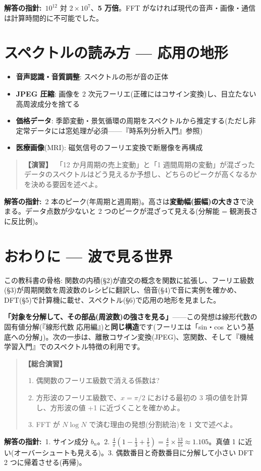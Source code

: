 \documentclass{article}
\begin{document}
\textbf{解答の指針:}\ \(10^{12}\) 対 \(2 \times 10^7\)、\textbf{5 万倍}。FFT がなければ現代の音声・画像・通信は計算時間的に不可能でした。

\section{スペクトルの読み方 — 応用の地形}

\begin{itemize}
\item \textbf{音声認識・音質調整}: スペクトルの形が音の正体
\item \textbf{JPEG 圧縮}: 画像を 2 次元フーリエ(正確にはコサイン変換)し、目立たない高周波成分を捨てる
\item \textbf{価格データ}: 季節変動・景気循環の周期をスペクトルから推定する(ただし非定常データには窓処理が必須——『時系列分析入門』参照)
\item \textbf{医療画像}(MRI): 磁気信号のフーリエ変換で断層像を再構成
\end{itemize}

\begin{quote}
\textbf{【演習】}\ 「12 か月周期の売上変動」と「1 週間周期の変動」が混ざったデータのスペクトルはどう見えるか予想し、どちらのピークが高くなるかを決める要因を述べよ。
\end{quote}

\textbf{解答の指針:}\ 2 本のピーク(年周期と週周期)。高さは\textbf{変動幅(振幅)の大きさ}で決まる。データ点数が少ないと 2 つのピークが混ざって見える(分解能 = 観測長さに反比例)。

\section{おわりに — 波で見る世界}

この教科書の骨格: 関数の内積(§2)が直交の概念を関数に拡張し、フーリエ級数(§3)が周期関数を周波数のレシピに翻訳し、倍音(§4)で音に実例を確かめ、DFT(§5)で計算機に載せ、スペクトル(§6)で応用の地形を見ました。

\textbf{「対象を分解して、その部品(周波数)の強さを見る」}——この発想は線形代数の固有値分解(『線形代数 応用編』)と\textbf{同じ構造}です(フーリエは「sin・cos という基底への分解」)。次の一歩は、離散コサイン変換(JPEG)、窓関数、そして『機械学習入門』でのスペクトル特徴の利用です。

\begin{quote}
\textbf{【総合演習】}
\begin{enumerate}
\item 偶関数のフーリエ級数で消える係数は?
\item 方形波のフーリエ級数で、\(x = \pi/2\) における最初の 3 項の値を計算し、方形波の値 +1 に近づくことを確かめよ。
\item FFT が \(N\log N\) で済む理由の発想(分割統治)を 1 文で述べよ。
\end{enumerate}
\end{quote}

\textbf{解答の指針:}\ 1. サイン成分 \(b_n\)。2. \(\frac{4}{\pi}(1 - \frac{1}{3} + \frac{1}{5}) = \frac{4}{\pi} \times \frac{13}{15} \approx 1.105\)。真値 1 に近い(オーバーシュートも見える)。3. 偶数番目と奇数番目に分解して小さい DFT 2 つに帰着させる(再帰)。
\end{document}
